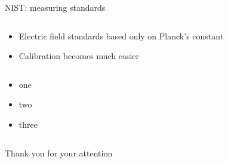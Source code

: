 \begin{columnframe}{NIST: measuring standards}
    \begin{column}{0.48\textwidth}
        \begin{itemize}
            \item Electric field standards based only on Planck's constant
            \item Calibration becomes much easier
        \end{itemize}
    \end{column}
    \begin{column}{0.48\textwidth}
        \begin{itemize}
            \item one
            \item two
            \item three
        \end{itemize}
    \end{column}

\end{columnframe}

\begin{frame}{}
    \centering
    \Large{Thank you for your attention}
\end{frame}

